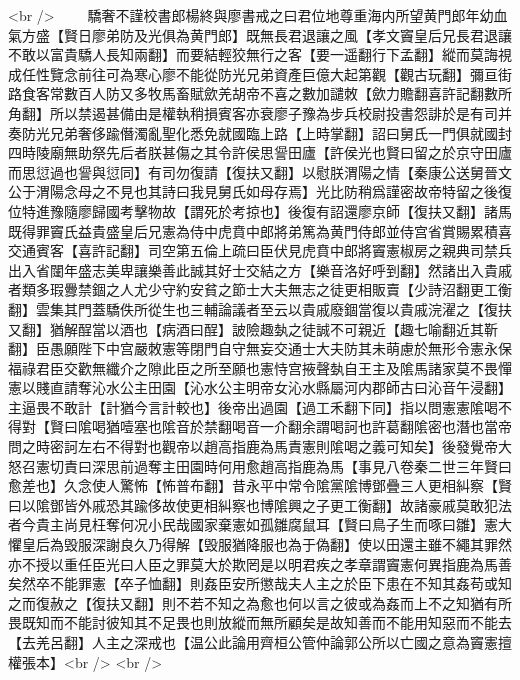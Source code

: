 <br />
　　驕奢不謹校書郎楊終與廖書戒之曰君位地尊重海内所望黄門郎年幼血氣方盛【賢日廖弟防及光俱為黄門郎】既無長君退讓之風【孝文竇皇后兄長君退讓不敢以富貴驕人長知兩翻】而要結輕狡無行之客【要一遥翻行下孟翻】縱而莫誨視成任性覽念前往可為寒心廖不能從防光兄弟資產巨億大起第觀【觀古玩翻】彌亘街路食客常數百人防又多牧馬畜賦歛羌胡帝不喜之數加譴敇【歛力贍翻喜許記翻數所角翻】所以禁遏甚備由是權執稍損賓客亦衰廖子豫為步兵校尉投書怨誹於是有司并奏防光兄弟奢侈踰僭濁亂聖化悉免就國臨上路【上時掌翻】詔曰舅氏一門俱就國封四時陵廟無助祭先后者朕甚傷之其令許侯思諐田廬【許侯光也賢曰留之於京守田廬而思愆過也諐與愆同】有司勿復請【復扶又翻】以慰朕渭陽之情【秦康公送舅晉文公于渭陽念母之不見也其詩曰我見舅氏如母存焉】光比防稍爲謹密故帝特留之後復位特進豫隨廖歸國考擊物故【謂死於考掠也】後復有詔還廖京師【復扶又翻】諸馬既得罪竇氏益貴盛皇后兄憲為侍中虎賁中郎將弟篤為黄門侍郎並侍宫省賞賜累積喜交通賓客【喜許記翻】司空第五倫上疏曰臣伏見虎賁中郎將竇憲椒房之親典司禁兵出入省闥年盛志美卑讓樂善此誠其好士交結之方【樂音洛好呼到翻】然諸出入貴戚者類多瑕釁禁錮之人尤少守約安貧之節士大夫無志之徒更相販賣【少詩沼翻更工衡翻】雲集其門蓋驕佚所從生也三輔論議者至云以貴戚廢錮當復以貴戚浣濯之【復扶又翻】猶解酲當以酒也【病酒曰酲】詖險趣埶之徒誠不可親近【趣七喻翻近其靳翻】臣愚願陛下中宫嚴敇憲等閉門自守無妄交通士大夫防其未萌慮於無形令憲永保福祿君臣交歡無纖介之隙此臣之所至願也憲恃宫掖聲埶自王主及隂馬諸家莫不畏憚憲以賤直請奪沁水公主田園【沁水公主明帝女沁水縣屬河内郡師古曰沁音午浸翻】主逼畏不敢計【計猶今言計較也】後帝出過園【過工禾翻下同】指以問憲憲隂喝不得對【賢曰隂喝猶噎塞也隂音於禁翻喝音一介翻余謂喝訶也許葛翻隂密也潛也當帝問之時密訶左右不得對也觀帝以趙高指鹿為馬責憲則隂喝之義可知矣】後發覺帝大怒召憲切責曰深思前過奪主田園時何用愈趙高指鹿為馬【事見八卷秦二世三年賢曰愈差也】久念使人驚怖【怖普布翻】昔永平中常令隂黨隂博鄧疊三人更相糾察【賢曰以隂鄧皆外戚恐其踰侈故使更相糾察也博隂興之子更工衡翻】故諸豪戚莫敢犯法者今貴主尚見枉奪何况小民哉國家棄憲如孤雛腐鼠耳【賢曰鳥子生而啄曰雛】憲大懼皇后為毁服深謝良久乃得解【毁服猶降服也為于偽翻】使以田還主雖不繩其罪然亦不授以重任臣光曰人臣之罪莫大於欺罔是以明君疾之孝章謂竇憲何異指鹿為馬善矣然卒不能罪憲【卒子恤翻】則姦臣安所懲哉夫人主之於臣下患在不知其姦苟或知之而復赦之【復扶又翻】則不若不知之為愈也何以言之彼或為姦而上不之知猶有所畏既知而不能討彼知其不足畏也則放縱而無所顧矣是故知善而不能用知惡而不能去【去羌呂翻】人主之深戒也【温公此論用齊桓公管仲論郭公所以亡國之意為竇憲擅權張本】<br />
<br />
